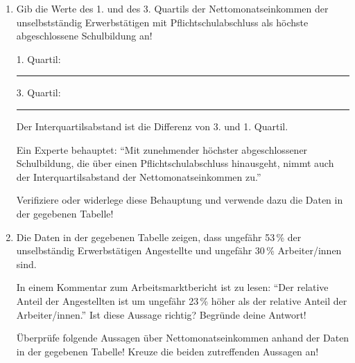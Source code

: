 \begin{langesbeispiel}
\begin{enumerate}
	\item {} Gib die Werte des 1. und des 3. Quartils der Nettomonatseinkommen der unselbstständig Erwerbstätigen mit Pflichtschulabschluss als höchste abgeschlossene Schulbildung an!
	
	1. Quartil: \rule{3cm}{0.3pt}
	
	3. Quartil: \rule{3cm}{0.3pt}\leer
	
	Der Interquartilsabstand ist die Differenz von 3. und 1. Quartil. 
	
	Ein Experte behauptet: "`Mit zunehmender höchster abgeschlossener Schulbildung, die über einen Pflichtschulabschluss hinausgeht, nimmt auch der Interquartilsabstand der Nettomonatseinkommen zu."' 
	
	Verifiziere oder widerlege diese Behauptung und verwende dazu die Daten in der gegebenen Tabelle!
 
	\item Die Daten in der gegebenen Tabelle zeigen, dass ungefähr 53\,\% der unselbständig Erwerbstätigen Angestellte und ungefähr 30\,\% Arbeiter/innen sind. 
	
	In einem Kommentar zum Arbeitsmarktbericht ist zu lesen: "`Der relative Anteil der Angestellten ist um ungefähr 23\,\% höher als der relative Anteil der Arbeiter/innen."' Ist diese Aussage richtig? Begründe deine Antwort! 
	
	Überprüfe folgende Aussagen über Nettomonatseinkommen anhand der Daten in der gegebenen Tabelle! Kreuze die beiden zutreffenden Aussagen an!\leer
	


\end{enumerate}
\end{langesbeispiel}

